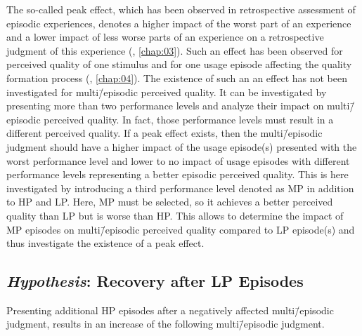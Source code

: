 The so-called peak effect, which has been observed in retrospective assessment of episodic experiences, denotes a higher impact of the worst part of an experience and a lower impact of less worse parts of an experience on a retrospective judgment of this experience (\cf, \autoref{chap:03}).
Such an effect has been observed for perceived quality of one stimulus and for one usage episode affecting the quality formation process (\cf, \autoref{chap:04}).
The existence of such an an effect has not been investigated for multi\=/episodic perceived quality.
It can be investigated by presenting more than two performance levels and analyze their impact on multi\=/episodic perceived quality.
In fact, those performance levels must result in a different perceived quality.
If a peak effect exists, then the multi\=/episodic judgment should have a higher impact of the usage episode(s) presented with the worst performance level and lower to no impact of usage episodes with different performance levels representing a better episodic perceived quality.
This is here investigated by introducing a third performance level denoted as \ac{MP} in addition to \ac{HP} and \ac{LP}.
Here, \ac{MP} must be selected, so it achieves a better perceived quality than \ac{LP} but is worse than \ac{HP}.
This allows to determine the impact of \ac{MP} episodes on multi\=/episodic perceived quality compared to \ac{LP} episode(s) and thus investigate the existence of a peak effect.



\subsection[H5: Recovery after \acs{LP} Episodes]{\emph{Hypothesis}: Recovery after \acs{LP} Episodes}
\begin{hypothesis}\label{hypo:recovery}
Presenting additional \ac{HP} episodes after a negatively affected multi\=/episodic judgment, results in an increase of the following multi\=/episodic judgment.
\end{hypothesis}


